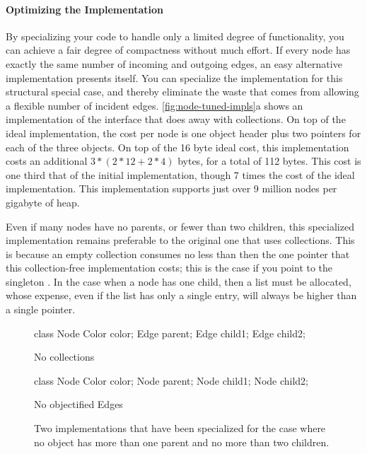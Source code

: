 \paragraph{Optimizing the Implementation}
By specializing your code to handle only a limited degree of functionality, you
can achieve a fair degree of compactness without much effort. If every node has
exactly the same number of incoming and outgoing edges, an easy alternative
implementation presents itself. You can specialize the implementation for this
structural special case, and thereby eliminate the waste that comes from allowing
a flexible number of incident edges.
\autoref{fig:node-tuned-impls}a shows an implementation of the 
interface that does away with collections. On top of the ideal implementation,
the cost per node is one object header plus two pointers for each of the three
 objects. On top of the 16 byte ideal cost, this implementation costs
an additional $3*(2*12 + 2*4)$ bytes, for a total of 112 bytes. This cost is one
third that of the initial implementation, though 7 times the cost of the ideal
implementation. This implementation supports just over 9 million nodes per
gigabyte of heap.

Even if many nodes have no parents, or fewer than two children, this specialized
implementation remains preferable to the original one that uses collections. This
is because an empty collection consumes no less than then the one pointer that
this collection-free implementation costs; this is the case if you point to the
singleton . In the case when a node has one child,
then a list must be allocated, whose expense, even if the list has only a single
entry, will always be higher than a single pointer.

\begin{figure}
\centering
\begin{subfloat}
\begin{minipage}[b]{0.38\textwidth}
\begin{shortlisting}
class Node {
   Color color;
   Edge parent;
   Edge child1;
   Edge child2;
}
\end{shortlisting}
\end{minipage}
\label{fig:node-no-collections}
\caption{No collections}
\end{subfloat}
\qquad
\begin{subfloat}
\begin{minipage}[b]{0.38\textwidth}
\begin{shortlisting}
class Node {
   Color color;
   Node parent;
   Node child1;
   Node child2;
}
\end{shortlisting} 
\end{minipage}
\caption{No objectified Edges}
\label{fig:node-no-Edge-objects}
\end{subfloat}
\caption{Two implementations that have been specialized for the case where
no object has more than one parent and no more than two children.}
\label{fig:node-tuned-impls}
\end{figure} 

